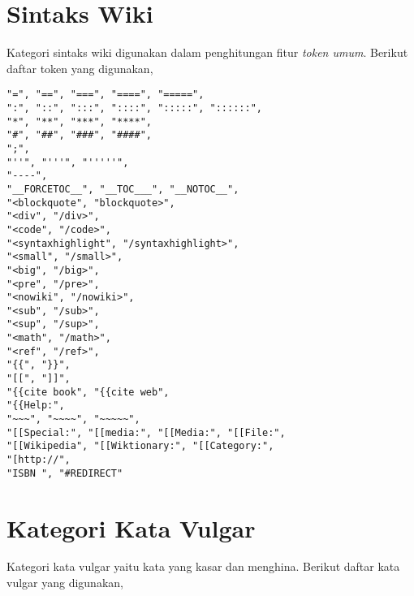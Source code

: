 \section{Sintaks Wiki}
\label{lampiran:words_wiki_token}

Kategori sintaks wiki digunakan dalam penghitungan fitur \textit{token umum}.
Berikut daftar token yang digunakan,

\begin{lstlisting}
"=", "==", "===", "====", "=====",
":", "::", ":::", "::::", ":::::", "::::::",
"*", "**", "***", "****",
"#", "##", "###", "####",
";",
"''", "'''", "'''''",
"----",
"__FORCETOC__", "__TOC___", "__NOTOC__",
"<blockquote", "blockquote>",
"<div", "/div>",
"<code", "/code>",
"<syntaxhighlight", "/syntaxhighlight>",
"<small", "/small>",
"<big", "/big>",
"<pre", "/pre>",
"<nowiki", "/nowiki>",
"<sub", "/sub>",
"<sup", "/sup>",
"<math", "/math>",
"<ref", "/ref>",
"{{", "}}",
"[[", "]]",
"{{cite book", "{{cite web",
"{{Help:",
"~~~", "~~~~", "~~~~~",
"[[Special:", "[[media:", "[[Media:", "[[File:",
"[[Wikipedia", "[[Wiktionary:", "[[Category:",
"[http://",
"ISBN ", "#REDIRECT"
\end{lstlisting}

\section{Kategori Kata Vulgar}
\label{lampiran:words_vulgar}

Kategori kata vulgar yaitu kata yang kasar dan menghina.
Berikut daftar kata vulgar yang digunakan,

